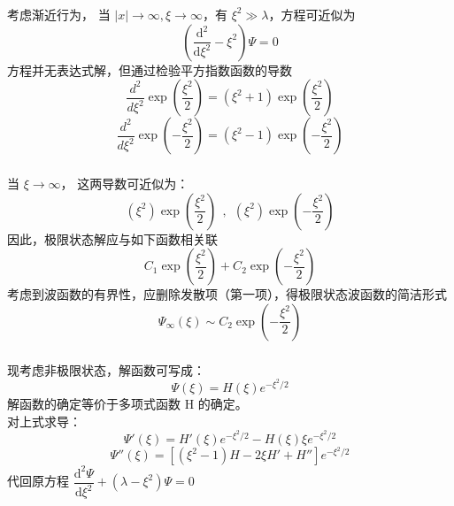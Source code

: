 \begin{frame}
	\frametitle{}
	考虑渐近行为， 当 $ |x| \to \infty,  \xi \to \infty$，有 $ \xi ^2  \gg  \lambda $，方程可近似为 \\
	\begin{equation*}
		\left(\frac{\mathrm{d} ^2}{\mathrm{d} \xi^2} - \xi^2 \right) \Psi=0
	\end{equation*}
	方程并无表达式解，但通过检验平方指数函数的导数\\
	\begin{equation*}
		\frac{d^2 }{d \xi ^2} \exp(\frac{\xi ^2}{2}) =(\xi ^2 +1)  \exp(\frac{\xi ^2}{2}) 
	\end{equation*}    
	\begin{equation*}
		\frac{d^2 }{d \xi ^2} \exp( - \frac{\xi ^2}{2}) =(\xi ^2 -1)  \exp( - \frac{\xi ^2}{2}) 
	\end{equation*}     	
\end{frame}

\begin{frame}
	\frametitle{}
	当 $ \xi \to \infty$， 这两导数可近似为：\\
	\begin{equation*}
		(\xi ^2 )  \exp( \frac{\xi ^2}{2}) ~~, ~~ (\xi ^2 )  \exp( - \frac{\xi ^2}{2}) 
	\end{equation*}     
	因此，极限状态解应与如下函数相关联
	\begin{equation*}
		C_1  \exp( \frac{\xi ^2}{2}) + C_2   \exp( - \frac{\xi ^2}{2})  
	\end{equation*}     
	考虑到波函数的有界性，应删除发散项（第一项），得极限状态波函数的简洁形式
	\begin{equation*}
		\Psi_\infty (\xi)  \sim C_2 \exp( - \frac{\xi ^2}{2})  
	\end{equation*}   
\end{frame}

\begin{frame}
	\frametitle{}
	现考虑非极限状态，解函数可写成： 
	\begin{equation*}
		\Psi(\xi) = H(\xi) e^{-\xi^2/2 }  
	\end{equation*}   
	解函数的确定等价于多项式函数 H 的确定。\\
	对上式求导：\\
	\begin{equation*}
		\Psi'(\xi) = H'(\xi) e^{-\xi^2/2 } -  H(\xi) \xi e^{-\xi^2/2 } 
	\end{equation*}  
	\begin{equation*}
		\Psi''(\xi) = \left[  \left( \xi^2 -1 \right) H -2\xi H' +H''  \right] e^{-\xi^2/2}
	\end{equation*}  
	代回原方程  $ \displaystyle \dfrac{\mathrm{d} ^2\Psi}{\mathrm{d} \xi^2} + \left( \lambda - \xi^2 \right) \Psi=0 $  \\ 
\end{frame}

